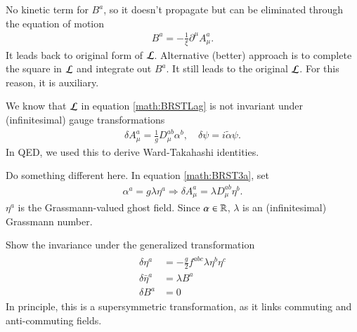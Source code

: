 No kinetic term for $B^a$, so it doesn't propagate but can be eliminated through the equation of motion 
\begin{align}
   B^a = - \frac{1}{\xi} \partial^\mu A_\mu^a.
   \label{math:BRSTEOM}
\end{align}
It leads back to original form of $\mathcal{L}$. Alternative (better) approach is to complete the square in $\mathcal{L}$ and integrate out $B^a$. It still leads to the original $\mathcal{L}$. For this reason, it is auxiliary.

We know that $\mathcal{L}$ in equation \ref{math:BRSTLag} is not invariant  under (infinitesimal) gauge transformations
\begin{align}
   \delta A_\mu^a = \frac{1}{g} D_\mu^{ab} \alpha^b, \quad \delta \psi = i \tilde{\alpha} \psi.
   \label{math:BRST3a}
\end{align}
In QED, we used this to derive Ward-Takahashi identities.

Do something different here. In equation \ref{math:BRST3a}, set
\begin{align*}
   \alpha^a = g \lambda \eta^a \Rightarrow \delta A_\mu^a = \lambda D_\mu^{ab} \eta^b.
\end{align*}
$\eta^a$ is the Grassmann-valued ghost field. Since $\alpha \in \mathbb{R}$, $\lambda$ is an (infinitesimal) Grassmann number.

Show the invariance under the generalized transformation
\begin{align}
   \begin{split}
      \delta \eta^a &= - \frac{g}{2} f^{abc} \lambda \eta^b \eta^c \\
      \delta \bar \eta^a &= \lambda B^a \\
      \delta B^a &= 0
   \end{split}
   \label{math:BRST3b}
\end{align}
In principle, this is a supersymmetric transformation, as it links commuting and anti-commuting fields.

